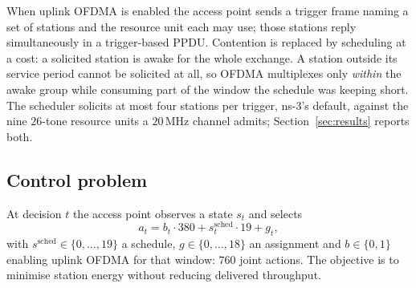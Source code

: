 When uplink OFDMA is enabled the access point sends a trigger frame naming a
set of stations and the resource unit each may use; those stations reply
simultaneously in a trigger-based PPDU. Contention is replaced by scheduling at
a cost: a solicited station is awake for the whole exchange. A station outside
its service period cannot be solicited at all, so OFDMA multiplexes only
\emph{within} the awake group while consuming part of the window the schedule
was keeping short. The scheduler solicits at most four
stations per trigger, ns-3's default, against the nine $26$-tone resource units
a $20$\,MHz channel admits; Section~\ref{sec:results} reports both.

\subsection{Control problem}

At decision $t$ the access point observes a state $s_t$ and selects
\begin{equation}
a_t = b_t \cdot 380 + s_t^{\mathrm{sched}} \cdot 19 + g_t,
\label{eq:action}
\end{equation}
with $s^{\mathrm{sched}} \in \{0,\dots,19\}$ a schedule, $g \in \{0,\dots,18\}$
an assignment and $b \in \{0,1\}$ enabling uplink OFDMA for that window: $760$
joint actions. The objective is to minimise station energy without reducing
delivered throughput.
